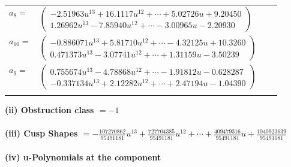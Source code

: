 \documentclass[1p]{elsarticle_modified}
\theoremstyle{definition}
\begin{document}
\begin{tabular}{m{7pt} m{180pt} m{7pt} m{180pt} }
\flushright $a_{8}=$&$\begin{pmatrix}-2.51963 u^{13}+16.1117 u^{12}+\cdots+5.02726 u+9.20450\\1.26962 u^{13}-7.85940 u^{12}+\cdots-3.00965 u-2.20930\end{pmatrix}$ \\
\flushright $a_{10}=$&$\begin{pmatrix}-0.886071 u^{13}+5.81710 u^{12}+\cdots-4.32125 u+10.3260\\0.471373 u^{13}-3.07741 u^{12}+\cdots+1.31159 u-3.50239\end{pmatrix}$ \\
\flushright $a_{9}=$&$\begin{pmatrix}0.755674 u^{13}-4.78868 u^{12}+\cdots-1.91812 u-0.628287\\-0.337134 u^{13}+2.12282 u^{12}+\cdots+2.47194 u-1.04390\end{pmatrix}$\\&\end{tabular}
\flushleft \textbf{(ii) Obstruction class $= -1$}\\~\\
\flushleft \textbf{(iii) Cusp Shapes $= -\frac{107270862}{95491181} u^{13}+\frac{727704385}{95491181} u^{12}+\cdots+\frac{409479316}{95491181} u+\frac{1040923639}{95491181}$}\\~\\
\newpage\renewcommand{\arraystretch}{1}
\flushleft \textbf{(iv) u-Polynomials at the component}\newline \\
\end{document}
